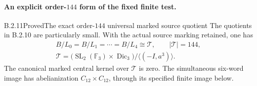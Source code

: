 \paragraph{An explicit order-$144$ form of the fixed finite test.}
\begin{result}{B.2.11}{Proved}{The exact order-$144$ universal marked source quotient}
The quotients in B.2.10 are particularly small.  With the
actual source marking retained, one has
\[
\begin{gathered}
 B/L_0=B/L_1=\cdots=B/L_4\cong\mathcal T,
 \qquad |\mathcal T|=144,\\
 \mathcal T=
 \bigl(\operatorname{SL}_2(\mathbb F_3)\times
           \operatorname{Dic}_3\bigr)/\langle(-I,a^3)\rangle.
\end{gathered}                                                     \tag{B.R7}
\]
The canonical marked central kernel over $\mathcal T$ is zero.
The simultaneous six-word image has abelianization
$C_{12}\times C_{12}$, through its specified finite image below.
\end{result}
